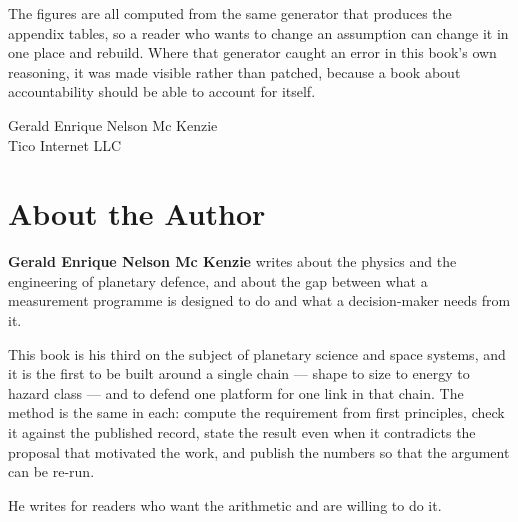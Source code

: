 The figures are all computed from the same generator that produces the
appendix tables, so a reader who wants to change an assumption can change it
in one place and rebuild. Where that generator caught an error in this
book's own reasoning, it was made visible rather than patched, because a
book about accountability should be able to account for itself.

\begin{flushright}
\small
Gerald Enrique Nelson Mc Kenzie\\
Tico Internet LLC
\end{flushright}
\clearpage

\chapter*{About the Author}
\thispagestyle{plain}

\textbf{Gerald Enrique Nelson Mc Kenzie} writes about the physics and the
engineering of planetary defence, and about the gap between what a
measurement programme is designed to do and what a decision-maker needs from
it.

This book is his third on the subject of planetary science and space
systems, and it is the first to be built around a single chain --- shape to
size to energy to hazard class --- and to defend one platform for one link
in that chain. The method is the same in each: compute the requirement from
first principles, check it against the published record, state the result
even when it contradicts the proposal that motivated the work, and publish
the numbers so that the argument can be re-run.

He writes for readers who want the arithmetic and are willing to do it.


